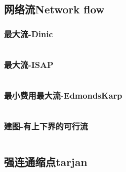 \documentclass[twoside,sub3section,UTF8]{ctexart}						%
\begin{document}
	\subsection{网络流Network flow}
		\subsubsection{最大流-Dinic}
			\inputminted{c++}{"Gragh Theory/Network Flow/dinic.cpp"}
		\subsubsection{最大流-ISAP}
			\inputminted{c++}{"Gragh Theory/Network Flow/ISAP.cpp"}
		\subsubsection{最小费用最大流-EdmondsKarp}
			\inputminted{c++}{"Gragh Theory/Network Flow/MCMF.cpp"}
		\subsubsection{建图-有上下界的可行流}
			\inputminted{c++}{"Gragh Theory/Network Flow/lowup.cpp"}

	
	\subsection{强连通缩点tarjan}
		\inputminted{c++}{"Gragh Theory/SCC.cpp"}
\end{document}
